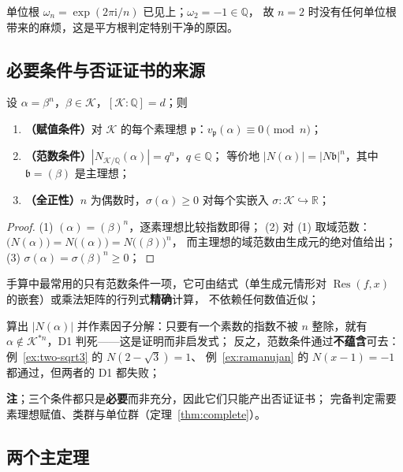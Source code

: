 \documentclass[UTF8,a4paper,11pt]{ctexart}
\newcommand{\ii}{\mathrm{i}}
\begin{document}
单位根 $\omega_n=\exp(2\pi\ii/n)$ 已见上；$\omega_2=-1\in\mathbb{Q}$，
故 $n=2$ 时没有任何单位根带来的麻烦，这是平方根判定特别干净的原因。
\subsection{必要条件与否证证书的来源}
\label{sec:necessary}

\begin{theorem}[$n$ 次幂的三个必要条件]
\label{thm:necessary}
设 $\alpha=\beta^n$，$\beta\in\mathscr{K}$，$[\mathscr{K}:\mathbb{Q}]=d$；则
\begin{enumerate}
\item \textbf{（赋值条件）}对 $\mathscr{K}$ 的每个素理想 $\mathfrak{p}$：$v_{\mathfrak{p}}(\alpha)\equiv0\pmod n$；
\item \textbf{（范数条件）}$|N_{\mathscr{K}/\mathbb{Q}}(\alpha)|=q^n$，$q\in\mathbb{Q}$；
等价地 $|N(\alpha)|=|N\mathfrak{b}|^n$，其中 $\mathfrak{b}=(\beta)$ 是主理想；
\item \textbf{（全正性）}$n$ 为偶数时，$\sigma(\alpha)\ge0$ 对每个实嵌入
$\sigma:\mathscr{K}\hookrightarrow\mathbb{R}$；
\end{enumerate}
\end{theorem}

\begin{proof}
(1) $(\alpha)=(\beta)^n$，逐素理想比较指数即得；
(2) 对 (1) 取域范数：$\bigl(N(\alpha)\bigr)=N\bigl((\alpha)\bigr)=N\bigl((\beta)\bigr)^n$，
而主理想的域范数由生成元的绝对值给出；
(3) $\sigma(\alpha)=\sigma(\beta)^n\ge0$；
\end{proof}

手算中最常用的只有范数条件一项，它可由结式（单生成元情形对
$\operatorname{Res}(f,x)$ 的嵌套）或乘法矩阵的行列式\textbf{精确}计算，
不依赖任何数值近似；\par

\begin{proposition}
算出 $|N(\alpha)|$ 并作素因子分解：只要有一个素数的指数不被 $n$ 整除，就有
$\alpha\notin\mathscr{K}^{*n}$，D1 判死——这是证明而非启发式；
反之，范数条件通过\textbf{不蕴含}可去：例~\ref{ex:two-sqrt3} 的 $N(2-\sqrt3)=1$、
例~\ref{ex:ramanujan} 的 $N(x-1)=-1$ 都通过，但两者的 D1 都失败；
\end{proposition}

\textbf{注}；三个条件都只是\textbf{必要}而非充分，因此它们只能产出否证证书；
完备判定需要素理想赋值、类群与单位群（定理~\ref{thm:complete}）。
\subsection{两个主定理}
\label{sec:main}
\end{document}
